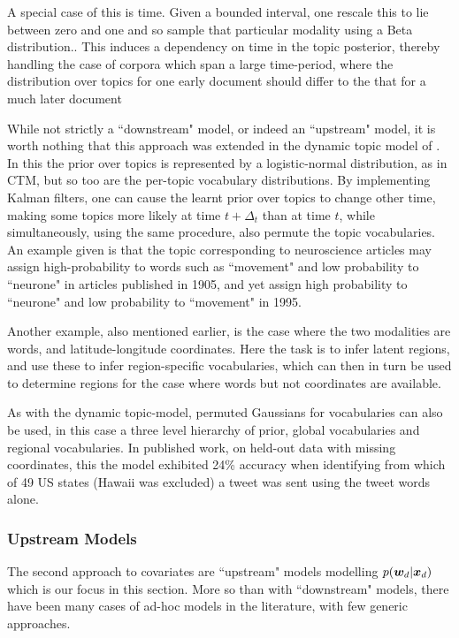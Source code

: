 A special case of this is time. Given a bounded interval, one rescale this to lie between zero and one and so sample that particular modality using a Beta distribution.\cite{Wang2006}. This induces a dependency on time in the topic posterior, thereby handling the case of corpora which span a large time-period, where the distribution over topics for one early document should differ to the that for a much later document

While not strictly a ``downstream" model, or indeed an ``upstream" model, it is worth nothing that this approach was extended in the dynamic topic model of \cite{Blei2006a}. In this the prior over topics is represented by a logistic-normal distribution, as in CTM, but so too are the per-topic vocabulary distributions. By implementing Kalman filters, one can cause the learnt prior over topics to change other time, making some topics more likely at time $t + \Delta_t$ than at time $t$, while simultaneously, using the same procedure, also permute the topic vocabularies. An example given is that the topic corresponding to neuroscience articles may assign high-probability to words such as ``movement" and low probability to ``neurone" in articles published in 1905, and yet assign high probability to ``neurone" and low probability to ``movement" in 1995.

Another example, also mentioned earlier, is the case where the two modalities are words, and latitude-longitude coordinates\cite{Eisenstein2010}. Here the task is to infer latent regions, and use these to infer region-specific vocabularies, which can then in turn be used to determine regions for the case where words but not coordinates are available.

As with the dynamic topic-model, permuted Gaussians for vocabularies can also be used, in this case a three level hierarchy of prior, global vocabularies and regional vocabularies. In published work, on held-out data with missing coordinates, this the model exhibited 24\% accuracy when identifying from which of 49 US states (Hawaii was excluded) a tweet was sent using the tweet words alone.

\subsubsection{Upstream Models}
The second approach to covariates are ``upstream" models modelling $p({ \bm w_d } | { \bm x_d })$ which is our focus in this section. More so than with ``downstream" models, there have been many cases of ad-hoc models in the literature, with few generic approaches.

